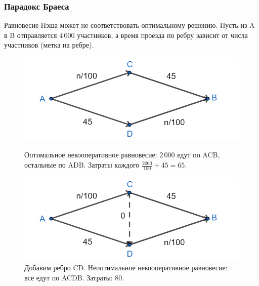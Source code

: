\documentclass{beamer}
\begin{document}
\begin{frame}\frametitle{Парадокс Браеса}
	Равновесие Нэша может не соответствовать оптимальному решению. Пусть из A в B отправляется $4\,000$ участников, а время проезда по ребру зависит от числа участников (метка на ребре).
	
	\begin{figure}[H]
		\begin{center}
			\begin{minipage}[h]{0.45\linewidth}
				\includegraphics[width=1\linewidth]{imgs/before_braess.png}
				\caption{Оптимальное некооперативное равновесие: $2\,000$ едут по ACB, остальные по ADB. Затраты каждого $\frac{2000}{100} + 45 = 65.$}
				\label{ris:braess_1}
			\end{minipage}
			\hfill
			\begin{minipage}[h]{0.45\linewidth}
				\includegraphics[width=1\linewidth]{imgs/after_braess.png}
				\caption{Добавим ребро CD. Неоптимальное некооперативное равновесие: все едут по ACDB. Затраты: 80.}
				\label{ris:braess_2}
			\end{minipage}
		\end{center}
	\end{figure}
	
\end{frame}
\end{document}
